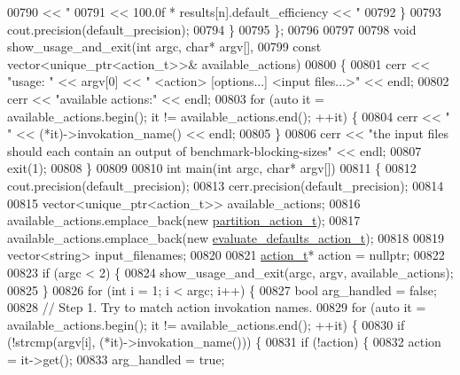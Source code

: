 \begin{DoxyCode}
{{{{{{00790            << \textcolor{stringliteral}{" %
00791            << 100.0f * results[n].default\_efficiency << \textcolor{stringliteral}{" %
00792     \}
00793     cout.precision(default\_precision);
00794   \}
00795 \};
00796 
00797 
00798 \textcolor{keywordtype}{void} show\_usage\_and\_exit(\textcolor{keywordtype}{int} argc, \textcolor{keywordtype}{char}* argv[],
00799                          \textcolor{keyword}{const} vector<unique\_ptr<action\_t>>& available\_actions)
00800 \{
00801   cerr << \textcolor{stringliteral}{"usage: "} << argv[0] << \textcolor{stringliteral}{" <action> [options...] <input files...>"} << endl;
00802   cerr << \textcolor{stringliteral}{"available actions:"} << endl;
00803   \textcolor{keywordflow}{for} (\textcolor{keyword}{auto} it = available\_actions.begin(); it != available\_actions.end(); ++it) \{
00804     cerr << \textcolor{stringliteral}{"  "} << (*it)->invokation\_name() << endl;
00805   \} 
00806   cerr << \textcolor{stringliteral}{"the input files should each contain an output of benchmark-blocking-sizes"} << endl;
00807   exit(1);
00808 \}
00809 
00810 \textcolor{keywordtype}{int} main(\textcolor{keywordtype}{int} argc, \textcolor{keywordtype}{char}* argv[])
00811 \{
00812   cout.precision(default\_precision);
00813   cerr.precision(default\_precision);
00814 
00815   vector<unique\_ptr<action\_t>> available\_actions;
00816   available\_actions.emplace\_back(\textcolor{keyword}{new} \hyperlink{structpartition__action__t}{partition\_action\_t});
00817   available\_actions.emplace\_back(\textcolor{keyword}{new} \hyperlink{structevaluate__defaults__action__t}{evaluate\_defaults\_action\_t});
00818 
00819   vector<string> input\_filenames;
00820 
00821   \hyperlink{structaction__t}{action\_t}* action = \textcolor{keyword}{nullptr};
00822 
00823   \textcolor{keywordflow}{if} (argc < 2) \{
00824     show\_usage\_and\_exit(argc, argv, available\_actions);
00825   \}
00826   \textcolor{keywordflow}{for} (\textcolor{keywordtype}{int} i = 1; i < argc; i++) \{
00827     \textcolor{keywordtype}{bool} arg\_handled = \textcolor{keyword}{false};
00828     \textcolor{comment}{// Step 1. Try to match action invokation names.}
00829     \textcolor{keywordflow}{for} (\textcolor{keyword}{auto} it = available\_actions.begin(); it != available\_actions.end(); ++it) \{
00830       \textcolor{keywordflow}{if} (!strcmp(argv[i], (*it)->invokation\_name())) \{
00831         \textcolor{keywordflow}{if} (!action) \{
00832           action = it->get();
00833           arg\_handled = \textcolor{keyword}{true};
}}}}}}}}
\end{DoxyCode}
